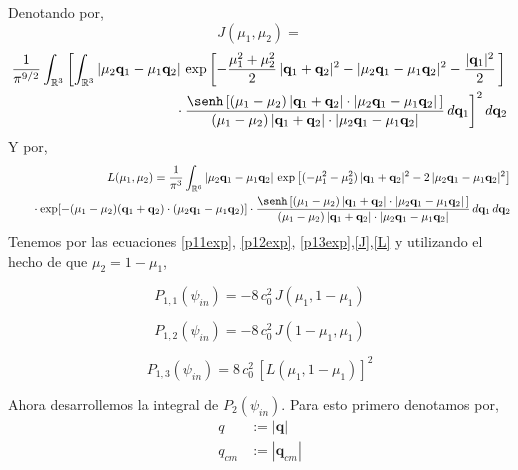\documentclass[12pt]{book}
\numberwithin{equation}{chapter}
\def\q{\mathbf{q}}
\def\R{\mathbb{R}}
\begin{document}
Denotando por,
$$J(\mu_{1},\mu_{2})= $$
\begin{align}\label{J}
\frac{1}{\pi^{9/2}} \int_{\R^{3}} \left[ \int_{\R^{3}}
|\mu_{2}\q_{1}-\mu_{1}\q_{2}|\, \exp \left[ -\frac{\mu_{1}^{2}+\mu_{2}^{2}}{2}\, |\q_{1}+\q_{2}|^{2} - |\mu_{2}\q_{1}-\mu_{1}\q_{2}|^{2}-\frac{|\q_{1}|^{2}}{2}\, \right]
\right.
\nonumber\\
\qquad \left. \vphantom{\int_{\R^{2}}}
\cdot \frac{ \senh \left[ (\mu_{1}-\mu_{2})\, |\q_{1}+\q_{2}|\cdot |\mu_{2}\q_{1}-\mu_{1}\q_{2}| \, \right]}{ (\mu_{1}-\mu_{2})\, |\q_{1}+\q_{2}|\cdot |\mu_{2}\q_{1}-\mu_{1}\q_{2}| }
\,d\q_{1} \right]^{2} d\q_{2}
\end{align}
Y por,
\begin{align}\label{L}
L(\mu_{1},\mu_{2})=
\frac{1}{\pi^{3}} \int_{\R^{6}}
|\mu_{2}\q_{1}-\mu_{1}\q_{2}|\, \exp \left[ (-\mu_{1}^{2}-\mu_{2}^{2})\, |\q_{1}+\q_{2}|^{2} - 2\,|\mu_{2}\q_{1}-\mu_{1}\q_{2}|^{2} \right]
\nonumber\\
\qquad \vphantom{\int_{\R^{6}}}
\cdot \exp[ -(\mu_{1}-\mu_{2})(\q_{1}+\q_{2})\cdot(\mu_{2}\q_{1}-\mu_{1}\q_{2}) ]
\cdot \frac{ \senh \left[ (\mu_{1}-\mu_{2})\, |\q_{1}+\q_{2}|\cdot |\mu_{2}\q_{1}-\mu_{1}\q_{2}| \, \right]}{ (\mu_{1}-\mu_{2})\, |\q_{1}+\q_{2}|\cdot |\mu_{2}\q_{1}-\mu_{1}\q_{2}| }
\,d\q_{1}\, d\q_{2}
\end{align}
Tenemos por las ecuaciones \eqref{p11exp}, \eqref{p12exp}, \eqref{p13exp},\eqref{J},\eqref{L} y utilizando el hecho de que $\mu_{2}=1-\mu_{1}$,

\begin{equation}\label{p1-1j}
P_{1,1}(\psi_{in})= -8\, c_{0}^{2}\, J(\mu_{1},1-\mu_{1})
\end{equation}

\begin{equation}\label{p1-2j}
P_{1,2}(\psi_{in})= -8\, c_{0}^{2}\, J(1-\mu_{1},\mu_{1})
\end{equation}

\begin{equation}\label{p1-3l}
P_{1,3}(\psi_{in})= 8\, c_{0}^{2}\, [ L(\mu_{1},1-\mu_{1}) ]^{2}
\end{equation}

Ahora desarrollemos la integral de $P_{2}(\psi_{in})$. Para esto primero denotamos por,
\begin{subequations}\label{q-qcm-n}
\begin{align*}
q &:= |\q|\\
q_{cm} &:= |\q_{cm}|
\end{align*}
\end{subequations}
\end{document}
